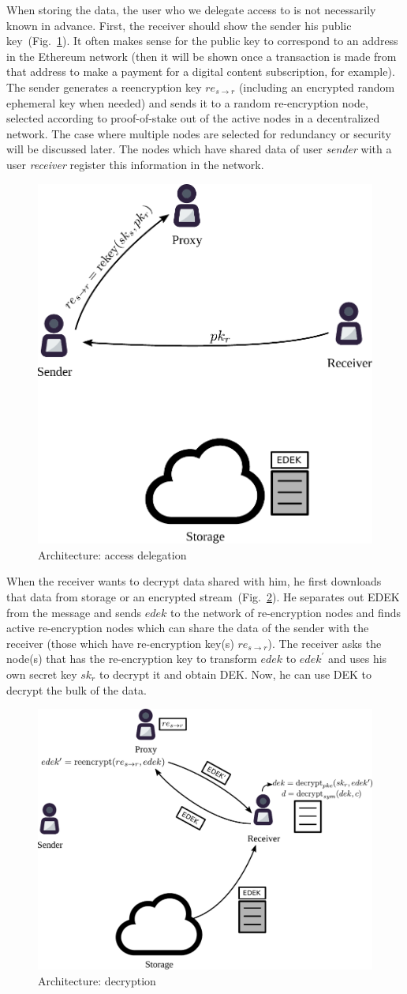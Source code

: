 \documentclass[notitlepage,longbibliography]{revtex4-1}
\begin{document}
When storing the data, the user who we delegate access to is not necessarily known in advance.
First, the receiver should show the sender his public key~(Fig.~\ref{fig:arch-delegate}).
It often makes sense for the public key to correspond to an address in the Ethereum network (then it will be shown once a transaction is made from that
address to make a payment for a digital content subscription, for example).
The sender generates a reencryption key $re_{s\rightarrow r}$ (including an encrypted random ephemeral key when needed) and sends it to a random re-encryption
node, selected according to proof-of-stake out of the active nodes in a decentralized network.
The case where multiple nodes are selected for redundancy or security will be discussed later.
The nodes which have shared data of user \emph{sender} with a user \emph{receiver} register this information in the network.
\begin{figure}
\centering
    \includegraphics[width=0.4\columnwidth]{pdf/delegate.pdf}
    \caption{Architecture: access delegation}
    \label{fig:arch-delegate}
\end{figure}

When the receiver wants to decrypt data shared with him, he first downloads that data from storage or an encrypted stream~(Fig.~\ref{fig:arch-decrypt}).
He separates out EDEK from the message and sends $edek$ to the network of re-encryption nodes and finds active re-encryption nodes which can share the data
of the sender with the receiver (those which have re-encryption key(s) $re_{s\rightarrow r}$).
The receiver asks the node(s) that has the re-encryption key to transform $edek$ to $edek^{\prime}$ and uses his own secret key $sk_r$ to decrypt it and
obtain DEK.
Now, he can use DEK to decrypt the bulk of the data.
\begin{figure}
\centering
    \includegraphics[width=0.6\columnwidth]{pdf/decrypt.pdf}
    \caption{Architecture: decryption}
    \label{fig:arch-decrypt}
\end{figure}
\end{document}
